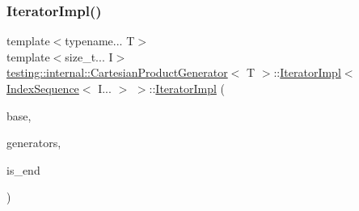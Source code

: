 \subsubsection{\texorpdfstring{IteratorImpl()}{IteratorImpl()}\hspace{0.1cm}{\footnotesize\ttfamily [2/2]}}
{\footnotesize\ttfamily template$<$typename... T$>$ \\
template$<$size\+\_\+t... I$>$ \\
\mbox{\hyperlink{classtesting_1_1internal_1_1_cartesian_product_generator}{testing\+::internal\+::\+Cartesian\+Product\+Generator}}$<$ T $>$\+::\mbox{\hyperlink{classtesting_1_1internal_1_1_cartesian_product_generator_1_1_iterator_impl}{Iterator\+Impl}}$<$ \mbox{\hyperlink{structtesting_1_1internal_1_1_index_sequence}{Index\+Sequence}}$<$ I... $>$ $>$\+::\mbox{\hyperlink{classtesting_1_1internal_1_1_cartesian_product_generator_1_1_iterator_impl}{Iterator\+Impl}} (\begin{DoxyParamCaption}\item[{const \mbox{\hyperlink{classtesting_1_1internal_1_1_param_generator_interface}{Param\+Generator\+Interface}}$<$ \mbox{\hyperlink{classtesting_1_1internal_1_1_cartesian_product_generator_af27131157a9347f0c82420ca081ee7dd}{Param\+Type}} $>$ $\ast$}]{base,  }\item[{const std\+::tuple$<$ \mbox{\hyperlink{classtesting_1_1internal_1_1_param_generator}{Param\+Generator}}$<$ T $>$... $>$ \&}]{generators,  }\item[{bool}]{is\+\_\+end }\end{DoxyParamCaption})\hspace{0.3cm}{\ttfamily [inline]}}

\mbox{\label{classtesting_1_1internal_1_1_cartesian_product_generator_1_1_iterator_impl_3_01_index_sequence_3_01_i_8_8_8_01_4_01_4_adf6a47392283d7e236b604f487cf8cfc}} 

